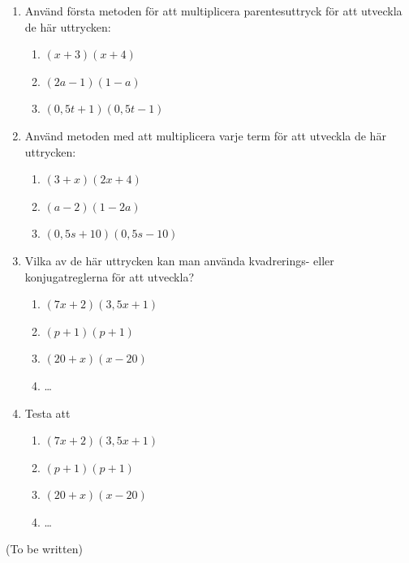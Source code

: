 \begin{enumerate}
  \item Använd första metoden för att multiplicera parentesuttryck för att utveckla de här uttrycken:
  \begin{enumerate}[a]
    \item $(x+3)(x+4)$
    \item $(2a-1)(1-a)$
    \item $(0{,}5t+1)(0{,}5t-1)$
  \end{enumerate}
  \item Använd metoden med att multiplicera varje term för att utveckla de här uttrycken:
  \begin{enumerate}[a]
    \item $(3+x)(2x+4)$
    \item $(a-2)(1-2a)$
    \item $(0{,}5s+10)(0{,}5s-10)$
  \end{enumerate}
  \item Vilka av de här uttrycken kan man använda kvadrerings- eller konjugatreglerna för att utveckla?
  \begin{enumerate}[a]
    \item $(7x+2)(3{,}5x+1)$
    \item $(p+1)(p+1)$
    \item $(20+x)(x-20)$
    \item \ldots
  \end{enumerate}
  \item Testa att 
  \begin{enumerate}[a]
    \item $(7x+2)(3{,}5x+1)$
    \item $(p+1)(p+1)$
    \item $(20+x)(x-20)$
    \item \ldots
  \end{enumerate}
\end{enumerate}

(To be written)
